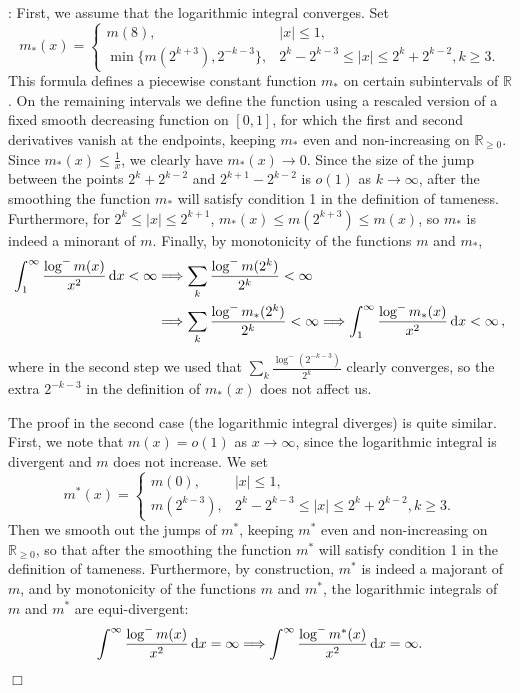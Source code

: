 \documentclass[12pt]{paper}
\newcommand{\bR}{\mathbb R}
\begin{document}
\medskip{}: 
First, we assume that the logarithmic integral converges.
Set
\[
m_*(x) = 
\begin{cases}
m(8), & |x|\le 1, \\
\min\{ m(2^{k+3}), 2^{-k-3}\}, & 2^k - 2^{k-3} \le |x| \le 2^k +2^{k-2}, k\ge 3.
\end{cases}
\]
This formula defines a piecewise constant function $m_*$ on certain subintervals of $\bR$.
On the remaining intervals we define the function using a rescaled version of a fixed smooth decreasing 
function on $[0, 1]$, for which the first and second derivatives vanish at the endpoints,
keeping $m_*$ even and non-increasing on $\bR_{\ge 0}$. 
Since $m_*(x)\le \frac{1}{x}$, we clearly have $m_*(x)\to 0$. Since the size of the jump between the points 
$2^k+2^{k-2}$ and $2^{k+1}-2^{k-2}$ is $o(1)$ as $k\to\infty$, after the smoothing the function $m_*$ 
will satisfy condition 1 in the definition of tameness. 
Furthermore, for $2^k \le |x| \le 2^{k+1}$, $m_*(x) \le m(2^{k+3}) \le m(x)$,
so $m_*$ is indeed a minorant of $m$. Finally, by monotonicity of the functions $m$ and $m_*$,
\begin{align*}
\int_1^\infty \frac{\log^-m(x)}{x^2}\, {\rm d}x <\infty  &\Longrightarrow \sum_k \frac{\log^- m(2^k)}{2^{k}}<\infty \\
&\Longrightarrow \sum_k \frac{\log^- m_*(2^k)}{2^{k}}<\infty  \Longrightarrow \int_1^\infty \frac{\log^- m_*(x)}{x^2}\, {\rm d}x <\infty\,,
\end{align*}
where in the second step we used that $\sum_k \frac{\log^-(2^{-k-3})}{2^k}$ clearly converges, so the extra $2^{-k-3}$ in the definition of $m_*(x)$ does not affect us.
 
The proof in the second case (the logarithmic integral diverges) is quite similar. First, 
we note that $m(x)=o(1)$ as $x\to\infty$, since the logarithmic integral is divergent and
$m$ does not increase. We set
\[
m^*(x) = 
\begin{cases}
m(0), & |x|\le 1, \\
m(2^{k-3}),  & 2^k - 2^{k-3} \le |x| \le 2^k +2^{k-2}, k\ge 3.
\end{cases}
\]
Then we smooth out the jumps of $m^*$, keeping $m^*$ even and non-increasing on $\bR_{\ge 0}$,
so that after the smoothing the function $m^*$
will satisfy condition 1 in the definition of tameness. 
Furthermore, by construction, $m^*$ is indeed a majorant of $m$, and by monotonicity of the functions $m$ and $m^*$,
the logarithmic integrals of $m$ and $m^*$ are equi-divergent:
\[
\int^\infty \frac{\log^-m(x)}{x^2}\, {\rm d}x  = \infty 
\Longrightarrow \int^\infty \frac{\log^- m^*(x)}{x^2}\, {\rm d}x  = \infty.
\]
\mbox{}\hfill $\Box$
\end{document}
